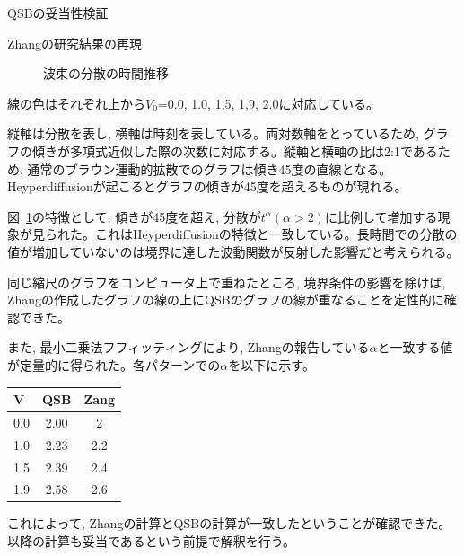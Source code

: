 \documentclass[a4paper, lualatex]{bxjsarticle}
\newcommand{\fref}[1]{図~\ref{#1}}
\begin{document}
\begin{section}{QSBの妥当性検証}
\begin{subsection}{Zhangの研究結果の再現}
\begin{figure}[h]
            \caption{波束の分散の時間推移}
             \label{bunsan}
        \end{figure}
        \par 線の色はそれぞれ上から$V_0$=0.0, 1.0, 1,5, 1,9, 2.0に対応している。
        \par 縦軸は分散を表し, 横軸は時刻を表している。両対数軸をとっているため, グラフの傾きが多項式近似した際の次数に対応する。縦軸と横軸の比は2:1であるため, 通常のブラウン運動的拡散でのグラフは傾き45度の直線となる。Heyperdiffusionが起こるとグラフの傾きが45度を超えるものが現れる。
        \par \fref{bunsan}の特徴として, 傾きが45度を超え, 分散が$t^\alpha(\alpha>2)$に比例して増加する現象が見られた。これはHeyperdiffusionの特徴と一致している。長時間での分散の値が増加していないのは境界に達した波動関数が反射した影響だと考えられる。
        \par 同じ縮尺のグラフをコンピュータ上で重ねたところ, 境界条件の影響を除けば, Zhangの作成したグラフの線の上にQSBのグラフの線が重なることを定性的に確認できた。
        \par また, 最小二乗法フフィッティングにより, Zhangの報告している$\alpha$と一致する値が定量的に得られた。各パターンでの$\alpha$を以下に示す。
        \begin{table}[h]
            \begin{tabular}{lcc}
                V&QSB & Zang\\ \hline
                0.0&2.00&2\\
                1.0&2.23&2.2\\
                1.5&2.39&2.4\\
                1.9&2.58&2.6
            \end{tabular}
        \end{table}
        \par これによって, Zhangの計算とQSBの計算が一致したということが確認できた。以降の計算も妥当であるという前提で解釈を行う。
    \end{subsection}
\end{section}

\newpage
\end{document}
